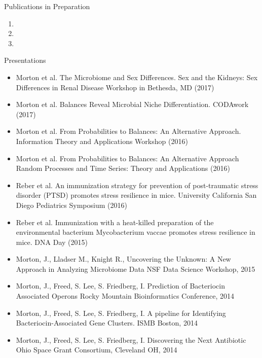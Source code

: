 \documentclass{resume} %
\begin{document}
\begin{rSection}{Publications in Preparation}
  \begin{enumerate}
    \item {}
    \item {}
    \item {}
  \end{enumerate}
\end{rSection}

\begin{rSection}{Presentations}
  \begin{itemize}
    \setlength\itemsep{0em}
    \item  Morton et al. The Microbiome and Sex Differences.
           Sex and the Kidneys: Sex Differences in Renal Disease Workshop in Bethesda, MD (2017)
    \item  Morton et al. Balances Reveal Microbial Niche Differentiation. CODAwork (2017)
    \item  Morton et al. From Probabilities to Balances: An Alternative Approach. Information Theory and Applications Workshop (2016)
    \item  Morton et al. From Probabilities to Balances: An Alternative Approach Random Processes and Time Series: Theory and Applications (2016)
    \item  Reber et al. An immunization strategy for prevention of post-traumatic stress disorder (PTSD) promotes stress resilience in mice.
                 University California San Diego Pediatrics Symposium  (2016)
    \item  Reber et al. Immunization with a heat-killed preparation of the environmental bacterium Mycobacterium vaccae
                promotes stress resilience in mice. DNA Day (2015)
    \item   Morton, J., Lladser M., Knight R., Uncovering the Unknown: A New Approach in
                Analyzing Microbiome Data NSF Data Science Workshop, 2015
    \item   Morton, J., Freed, S. Lee, S. Friedberg, I. Prediction of Bacteriocin Associated Operons
                Rocky Mountain Bioinformatics Conference, 2014
    \item   Morton, J., Freed, S. Lee, S. Friedberg, I. A pipeline for Identifying Bacteriocin-Associated
                Gene Clusters. ISMB Boston, 2014
    \item   Morton, J., Freed, S. Lee, S. Friedberg, I. Discovering the Next Antibiotic
                Ohio Space Grant Consortium, Cleveland OH, 2014

\end{itemize}
\end{rSection}
\end{document}
